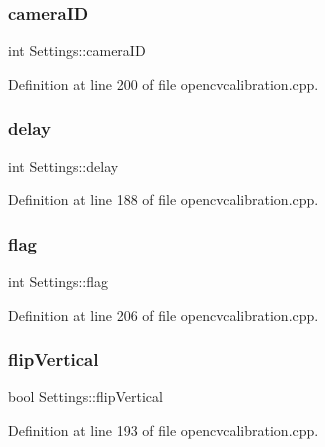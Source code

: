 \subsubsection{\texorpdfstring{cameraID}{cameraID}}
{\footnotesize\ttfamily int Settings\+::camera\+ID}



Definition at line 200 of file opencvcalibration.\+cpp.

\mbox{\label{classSettings_a5fe947366441009187d633f9e4663256}} 
\subsubsection{\texorpdfstring{delay}{delay}}
{\footnotesize\ttfamily int Settings\+::delay}



Definition at line 188 of file opencvcalibration.\+cpp.

\mbox{\label{classSettings_aba5691e3e76525f93ea254e654ec3717}} 
\subsubsection{\texorpdfstring{flag}{flag}}
{\footnotesize\ttfamily int Settings\+::flag}



Definition at line 206 of file opencvcalibration.\+cpp.

\mbox{\label{classSettings_ab6304f260b315d2820f755e1c3a052b5}} 
\subsubsection{\texorpdfstring{flipVertical}{flipVertical}}
{\footnotesize\ttfamily bool Settings\+::flip\+Vertical}



Definition at line 193 of file opencvcalibration.\+cpp.

\mbox{\label{classSettings_a3b9fc27b555f982bd5b9ea5198e1f7e3}} 
